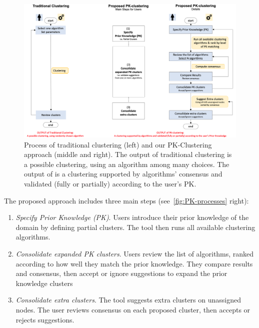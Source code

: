 \begin{figure}[!ht]
    \centering
    \includegraphics[width=\textwidth]{static/figures/PK-Clustering/VISPaperFigures/pkprocess}
    \caption{Process of traditional clustering (left) and our PK-Clustering approach (middle and right). The output of traditional clustering is a possible clustering, using an algorithm among many choices. The output of \pkclustering is a clustering supported by algorithms' consensus and validated (fully or partially) according to the user's PK.}
\label{fig:PK-processes}
\end{figure}
The proposed approach includes three main steps (see~\autoref{fig:PK-processes} right):
\begin{enumerate}[nosep]
\item \textit{Specify Prior Knowledge (PK)}. Users introduce their prior knowledge of the domain by defining partial clusters. The tool then runs all available clustering algorithms.
\item \textit{Consolidate expanded PK clusters}. Users review the list of algorithms, ranked according to how well they match the prior knowledge.  They compare results and consensus, then accept or ignore suggestions to expand the prior knowledge clusters
\item \textit{Consolidate extra clusters}. The tool suggests extra clusters on unassigned nodes. The user reviews consensus on each proposed cluster, then accepts or rejects suggestions.
\end{enumerate}

